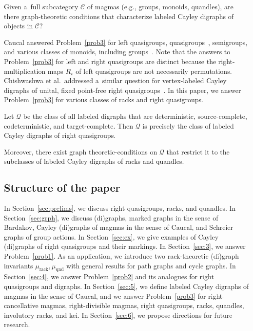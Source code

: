 \documentclass{jonasart}
\begin{document}
	\begin{problem}\label{prob3}
		Given a~full subcategory $\mathcal{C}$ of magmas (e.g., groups, monoids, quandles), are there graph-theoretic conditions that characterize labeled Cayley digraphs of objects in $\mathcal{C}$?
	\end{problem}
    
	Caucal answered Problem~\ref{prob3} for left quasigroups, quasigroups~\cite{caucal}, semigroups, and various classes of monoids, including groups~\cite{caucal2}. Note that the answers to Problem~\ref{prob3} for left and right quasigroups are distinct because the right-multiplication maps $R_v$ of left quasigroups are not necessarily permutations. Chishwashwa et al.\ addressed a~similar question for vertex-labeled Cayley digraphs of unital, fixed point-free right quasigroups~\cite{groupoid1}. In this paper, we answer Problem~\ref{prob3} for various classes of racks and right quasigroups.
    
	\begin{theorem}
		Let $\mathcal{Q}$ be the class of all labeled digraphs that are deterministic, source-complete, codeterministic, and target-complete. Then $\mathcal{Q}$ is precisely the class of labeled Cayley digraphs of right quasigroups.

		Moreover, there exist graph theoretic-conditions on $\mathcal{Q}$ that restrict it to the subclasses of labeled Cayley digraphs of racks and quandles.
	\end{theorem}
    
	\subsection{Structure of the paper}

	In Section~\ref{sec:prelims}, we discuss right quasigroups, racks, and quandles.
	In Section~\ref{sec:grph}, we discuss (di)graphs, marked graphs in the sense of Bardakov, Cayley (di)graphs of magmas in the sense of Caucal, and Schreier graphs of group actions.
	In Section~\ref{sec:ex}, we give examples of Cayley (di)graphs of right quasigroups and their markings.
	In Section~\ref{sec:3}, we answer Problem~\ref{prob1}. As an application, we introduce two rack-theoretic (di)graph invariants $\mu_{\mathrm{rack}},\mu_{\mathrm{qnd}}$ with general results for path graphs and cycle graphs.
	In Section~\ref{sec:4}, we answer Problem~\ref{prob2} and its analogues for right quasigroups and digraphs.
	In Section~\ref{sec:5}, we define labeled Cayley digraphs of magmas in the sense of Caucal, and we answer Problem~\ref{prob3} for right-cancellative magmas, right-divisible magmas, right quasigroups, racks, quandles, involutory racks, and kei.
	In Section~\ref{sec:6}, we propose directions for future research.
\end{document}
